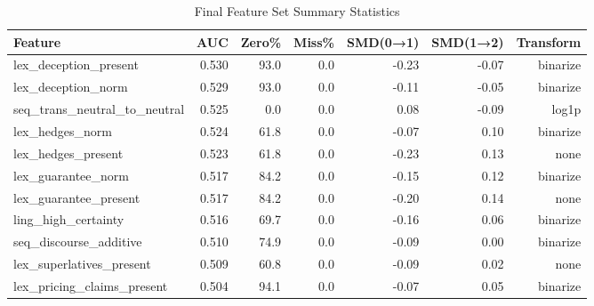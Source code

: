 \begin{table}[htbp]
\centering
\caption{Final Feature Set Summary Statistics}
\label{tab:final_features}
\begin{tabular}{lrrrrrr}
\toprule
Feature & AUC & Zero\% & Miss\% & SMD(0→1) & SMD(1→2) & Transform \\
\midrule
lex\_deception\_present & 0.530 & 93.0 & 0.0 & -0.23 & -0.07 & binarize \\
lex\_deception\_norm & 0.529 & 93.0 & 0.0 & -0.11 & -0.05 & binarize \\
seq\_trans\_neutral\_to\_neutral & 0.525 & 0.0 & 0.0 & 0.08 & -0.09 & log1p \\
lex\_hedges\_norm & 0.524 & 61.8 & 0.0 & -0.07 & 0.10 & binarize \\
lex\_hedges\_present & 0.523 & 61.8 & 0.0 & -0.23 & 0.13 & none \\
lex\_guarantee\_norm & 0.517 & 84.2 & 0.0 & -0.15 & 0.12 & binarize \\
lex\_guarantee\_present & 0.517 & 84.2 & 0.0 & -0.20 & 0.14 & none \\
ling\_high\_certainty & 0.516 & 69.7 & 0.0 & -0.16 & 0.06 & binarize \\
seq\_discourse\_additive & 0.510 & 74.9 & 0.0 & -0.09 & 0.00 & binarize \\
lex\_superlatives\_present & 0.509 & 60.8 & 0.0 & -0.09 & 0.02 & none \\
lex\_pricing\_claims\_present & 0.504 & 94.1 & 0.0 & -0.07 & 0.05 & binarize \\
\bottomrule
\end{tabular}
\end{table}
